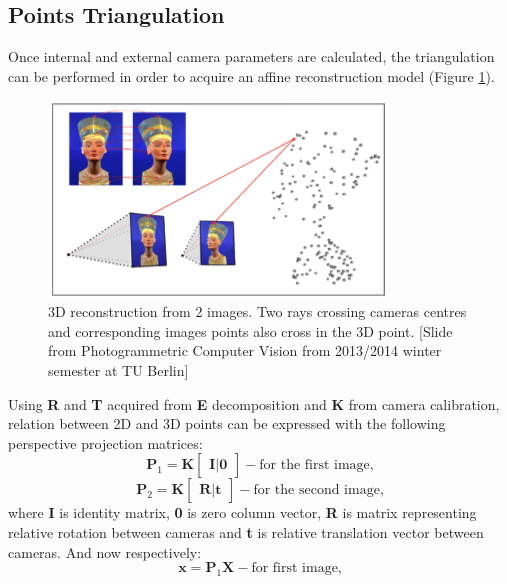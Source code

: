 \subsection{Points Triangulation} \label{sec:points_triangulation}
Once internal and external camera parameters are calculated, the triangulation can be performed in order to acquire an affine reconstruction model (Figure \ref{fig:3Dreconstruction}).
\begin{figure}[h]
    \centering
    \includegraphics[width=0.8\textwidth]{3Dreconstruction}
    \caption[3D reconstruction from 2 images]{3D reconstruction from 2 images. Two rays crossing cameras centres and corresponding images points also cross in the 3D point. [Slide from Photogrammetric Computer Vision from 2013/2014 winter semester at TU Berlin]}
    \label{fig:3Dreconstruction}
\end{figure}
Using \textbf{R} and \textbf{T} acquired from \textbf{E} decomposition and \textbf{K} from camera calibration, relation between 2D and 3D points can be expressed with the following perspective projection matrices:
\begin{equation}
 \textbf{P}_{1} = \textbf{K} \begin{bmatrix}\textbf{I}\mid \textbf{0}\end{bmatrix} - \text{for the first image,}
\end{equation}
\begin{equation}
 \textbf{P}_{2} = \textbf{K}  \begin{bmatrix}\textbf{R}\mid \textbf{t}\end{bmatrix} - \text{for the second image,}
\end{equation}
where \textbf{I} is identity matrix, \textbf{0} is zero column vector, \textbf{R} is matrix representing relative rotation between cameras and \textbf{t} is relative translation vector between cameras. And now respectively:
\begin{equation}
 \textbf{x} = \textbf{P}_{1} \textbf{X} - \text{for first image,}
\end{equation}
